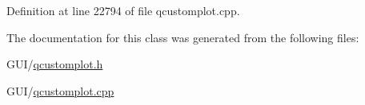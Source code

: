 Definition at line 22794 of file qcustomplot.\+cpp.



The documentation for this class was generated from the following files\+:\begin{DoxyCompactItemize}
\item 
G\+U\+I/\hyperlink{qcustomplot_8h}{qcustomplot.\+h}\item 
G\+U\+I/\hyperlink{qcustomplot_8cpp}{qcustomplot.\+cpp}\end{DoxyCompactItemize}
